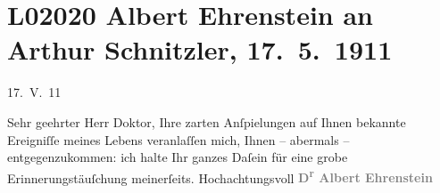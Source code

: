 

\section[Albert Ehrenstein an Arthur Schnitzler, 17. 5. 1911]{L02020 Albert Ehrenstein an Arthur Schnitzler, 17. 5. 1911}
\nopagebreak{}
\rehead{ }\normalsize\beginnumbering{}
\toendnotes[C]{\smallbreak\pagebreak[2]}
\pstart
           \raggedleft{}{\pb}17. V. 11\pend
           
\pstart{}Sehr geehrter Herr Doktor,\pend\vspace{0.5em}
\pstart
           Ihre zarten Anſpielungen auf Ihnen bekannte Ereigniſſe meines Lebens veranlaſſen
               mich, Ihnen – abermals – entgegenzukommen: ich halte Ihr ganzes Daſein für eine grobe
               Erinnerungstäuſchung meinerſeits.\pend
           \pstart Hochachtungsvoll\pend{}
\pstart
           \centering{}{\pb}\textcolor{gray}{\textbf{D\textsuperscript{r} Albert Ehrenstein}}\pend
           \endnumbering{}  
      